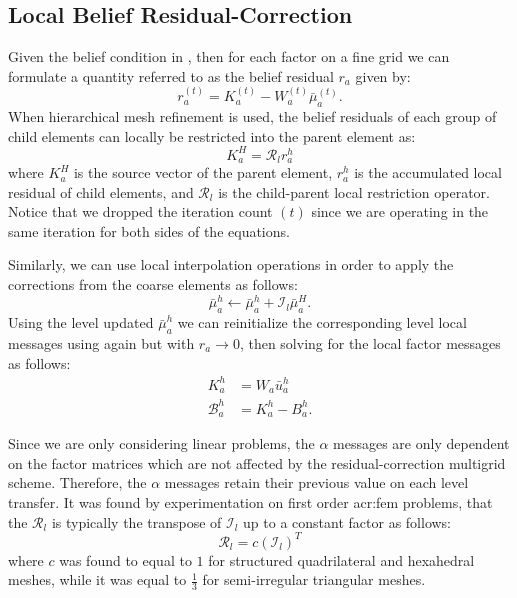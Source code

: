 \subsection{Local Belief Residual-Correction}
Given the belief condition in , then for each factor on a fine grid we can formulate a quantity referred to as the belief residual $r_a$ given by:
\begin{equation}
	r_a^{(t)} = K_a^{(t)} - W_a^{(t)} \bar{\mu}_a^{(t)} \label{eqn:br}.
\end{equation}
When hierarchical mesh refinement is used, the belief residuals of each group of child elements can locally be restricted into the parent element as:
\begin{equation}
	K^H_a =\mathcal{R}_l r^{h}_a \label{eqn_rr}
\end{equation}
where $K^H_a$ is the source vector of the parent element, $r^{h}_a$ is the accumulated local residual of child elements, and $\mathcal{R}_l$ is the child-parent local restriction operator.
Notice that we dropped the iteration count $(t)$ since we are operating in the same iteration for both sides of the equations.


Similarly, we can use local interpolation operations in order to apply the corrections from the coarse elements as follows:
\begin{equation}
	\bar{\mu}_a^h \gets \bar{\mu}_a^h + \mathcal{I}_l \bar{\mu}_a^H.
\end{equation}
Using the level updated $\bar{\mu}_a^h$ we can reinitialize the corresponding level local messages using again  but with $r_a \to 0$, then solving for the local factor messages as follows:
\begin{align}
	K_a^h & = W_a \bar{u}_a^h\\
	\mathcal{B}_a^h & = K_a^h - B_a^h. \label{eqn:messCorr}
\end{align}


Since we are only considering linear problems, the $\alpha$ messages are only dependent on the factor matrices which are not affected by the residual-correction multigrid scheme.
Therefore, the $\alpha$ messages retain their previous value on each level transfer.
It was found by experimentation on first order \gls{acr:fem} problems, that the $\mathcal{R}_l$ is typically the transpose of $\mathcal{I}_l$ up to a constant factor as follows:
\begin{equation}
	\mathcal{R}_l = c \left(\mathcal{I}_l\right)^T \label{eqn:galerkinCnd}
\end{equation}
where $c$ was found to equal to $1$ for structured quadrilateral and hexahedral meshes, while it was equal to $\frac{1}{3}$ for semi-irregular triangular meshes.


